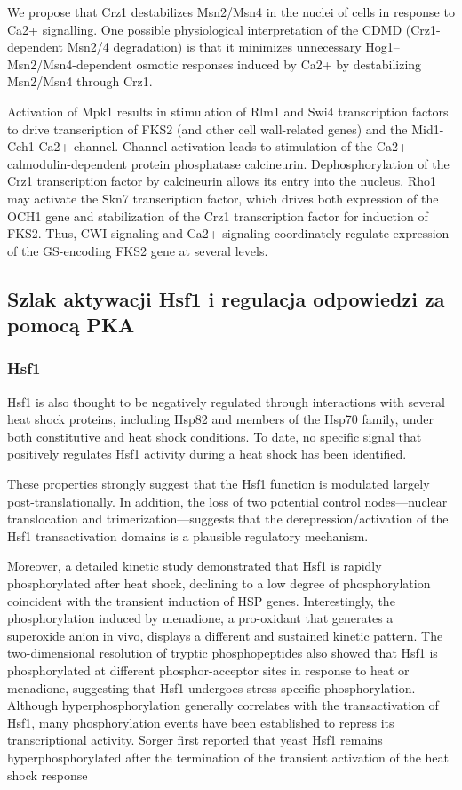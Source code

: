 \documentclass{pracamgr}
\begin{document}
We propose that Crz1 destabilizes Msn2/Msn4 in the nuclei of cells in response to Ca2+ signalling.
One possible physiological interpretation of the CDMD (Crz1-dependent Msn2/4 degradation) is that it minimizes unnecessary
Hog1–Msn2/Msn4-dependent osmotic responses induced by Ca2+ by destabilizing Msn2/Msn4 through Crz1.\cite{Crz1DestabilizesMsn}

Activation of Mpk1 results in
stimulation of Rlm1 and Swi4 transcription factors to drive 
transcription of FKS2 (and other cell wall-related genes) and the Mid1-Cch1
Ca2+ channel. Channel activation leads to stimulation of the Ca2+-
calmodulin-dependent protein phosphatase calcineurin. 
Dephosphorylation of the Crz1 transcription factor by calcineurin allows its entry
into the nucleus. Rho1 may activate the Skn7 transcription factor,
which drives both expression of the OCH1 gene and
stabilization of the Crz1 transcription factor for induction of FKS2.
Thus, CWI signaling and Ca2+ signaling coordinately regulate
expression of the GS-encoding FKS2 gene at several levels.\cite{CWI}
\subsection{Szlak aktywacji Hsf1 i regulacja odpowiedzi za pomocą PKA}
\subsubsection{Hsf1}
Hsf1 is also thought to be negatively regulated
through interactions with several heat shock proteins, including
Hsp82 and members of the Hsp70 family, under both
constitutive and heat shock conditions. To
date, no specific signal that positively regulates Hsf1 activity
during a heat shock has been identified.\cite{TrehaloseRegulatorHsf}

These properties
strongly suggest that the Hsf1 function is modulated largely post-translationally. 
In addition, the loss of two potential control
nodes—nuclear translocation and trimerization—suggests that
the derepression/activation of the Hsf1 transactivation domains is
a plausible regulatory mechanism.\cite{Bible}

 Moreover, a detailed kinetic study 
 demonstrated that Hsf1 is rapidly phosphorylated after heat shock,
declining to a low degree of phosphorylation coincident with the
transient induction of HSP genes. Interestingly, the 
phosphorylation induced by menadione, a pro-oxidant that generates
a superoxide anion in vivo, displays a different and sustained 
kinetic pattern. The two-dimensional resolution of tryptic
phosphopeptides also showed that Hsf1 is phosphorylated at different
phosphor-acceptor sites in response to heat or menadione,
suggesting that Hsf1 undergoes stress-specific phosphorylation.
Although hyperphosphorylation generally correlates with the
transactivation of Hsf1, many phosphorylation events have been
established to repress its transcriptional activity. Sorger first
reported that yeast Hsf1 remains hyperphosphorylated after
the termination of the transient activation of the heat shock response\cite{Bible}
\end{document}
